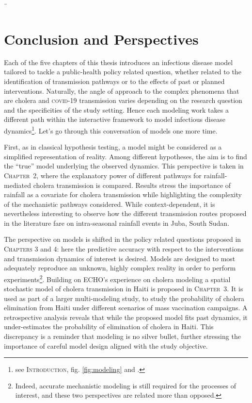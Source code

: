¨\chapter*{Conclusion and Perspectives}
Each of the five chapters of this thesis introduces an infectious disease model tailored to tackle a public-health policy related question, whether related to the identification of transmission pathways or to the effects of past or planned interventions. Naturally, the angle of approach to the complex phenomena that are cholera and \textsc{covid}-19 transmission varies depending on the research question and the specificities of the study setting. Hence each modeling work takes a different path within the interactive framework to model infectious disease dynamics\footnote{see \textsc{Introduction}, fig. \ref{fig:modeling} and .}.  Let's go through this conversation of models one more time.


First, as in classical hypothesis testing, a model might be considered as a simplified representation of reality. Among different hypotheses, the aim is to find the ``true'' model underlying the observed dynamics. This perspective is taken in \textsc{Chapter~2}, where the explanatory power of different pathways for rainfall-mediated cholera transmission is compared\cite{Rinaldo:Reassessment20102011:2012, Eisenberg:ExaminingRainfallCholera:2013}. Results stress the importance of rainfall as a covariate for cholera transmission while highlighting the complexity of the mechanistic pathways considered. While context-dependent, it is nevertheless interesting to observe how the different transmission routes proposed in the literature fare on intra-seasonal rainfall events in Juba, South Sudan.

The perspective on models is shifted in the policy related questions proposed in \textsc{Chapters 3} and 4: here the predictive accuracy with respect to the interventions and transmission dynamics of interest is desired. Models are designed to most adequately reproduce an unknown, highly complex reality in order to perform experiments\footnote{Indeed, accurate mechanistic modeling is still required for the processes of interest, and these two perspectives are related more than opposed.}. Building on ECHO's experience on cholera modeling\cite{Rinaldo:RiverNetworksEcological:2020a} a spatial stochastic model of cholera transmission in Haiti is proposed in \textsc{Chapter~3}. It is used as part of a larger multi-modeling study\cite{Lee:AchievingCoordinatedNational:2020}, to study the probability of cholera elimination from Haiti under different scenarios of mass vaccination campaigns. A retrospective analysis reveals that while the proposed model fits past dynamics, it under-estimates the probability of elimination of cholera in Haiti. This discrepancy is a reminder that modeling is no silver bullet, further stressing the importance of careful model design aligned with the study objective. 

